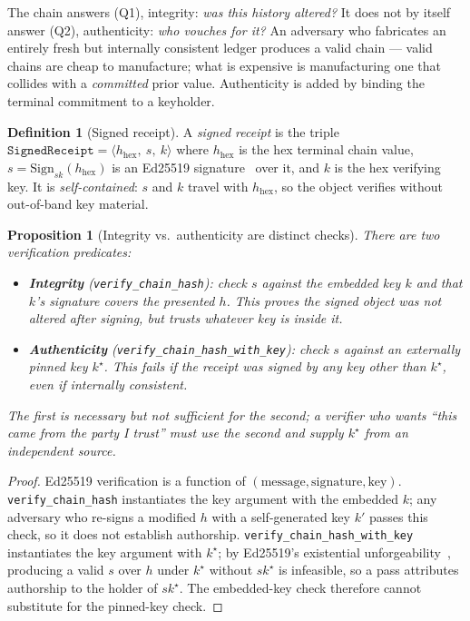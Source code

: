 \documentclass[11pt,oneside]{book}
\theoremstyle{definition}
\newtheorem{definition}{Definition}[chapter]
\theoremstyle{plain}
\newtheorem{proposition}[theorem]{Proposition}
\theoremstyle{remark}
\newcommand{\code}[1]{\texttt{#1}}
\begin{document}
The chain answers (Q1), integrity: \emph{was this history altered?} It does not by itself
answer (Q2), authenticity: \emph{who vouches for it?} An adversary who fabricates an entirely
fresh but internally consistent ledger produces a valid chain --- valid chains are cheap to
manufacture; what is expensive is manufacturing one that collides with a \emph{committed}
prior value. Authenticity is added by binding the terminal commitment to a keyholder.

\begin{definition}[Signed receipt]\label{def:signed}
A \emph{signed receipt} is the triple
$\code{SignedReceipt}=\langle h_{\mathrm{hex}},\ s,\ k\rangle$ where $h_{\mathrm{hex}}$ is the
hex terminal chain value, $s=\mathrm{Sign}_{sk}(h_{\mathrm{hex}})$ is an Ed25519
signature~\cite{ed25519} over it, and $k$ is the hex verifying key. It is \emph{self-contained}:
$s$ and $k$ travel with $h_{\mathrm{hex}}$, so the object verifies without out-of-band key
material.
\end{definition}

\begin{proposition}[Integrity vs.\ authenticity are distinct checks]\label{prop:intauth}
There are two verification predicates:
\begin{itemize}[leftmargin=*]
\item \textbf{Integrity} (\code{verify\_chain\_hash}): check $s$ against the \emph{embedded}
key $k$ and that $k$'s signature covers the presented $h$. This proves the signed object was
not altered after signing, but trusts whatever key is inside it.
\item \textbf{Authenticity} (\code{verify\_chain\_hash\_with\_key}): check $s$ against an
\emph{externally pinned} key $k^{\star}$. This fails if the receipt was signed by any key other
than $k^{\star}$, even if internally consistent.
\end{itemize}
The first is necessary but not sufficient for the second; a verifier who wants ``this came from
the party I trust'' must use the second and supply $k^{\star}$ from an independent source.
\end{proposition}

\begin{proof}
Ed25519 verification is a function of $(\text{message},\text{signature},\text{key})$.
\code{verify\_chain\_hash} instantiates the key argument with the embedded $k$; any adversary
who re-signs a modified $h$ with a self-generated key $k'$ passes this check, so it does not
establish authorship. \code{verify\_chain\_hash\_with\_key} instantiates the key argument with
$k^{\star}$; by Ed25519's existential unforgeability~\cite{ed25519}, producing a valid $s$ over
$h$ under $k^{\star}$ without $sk^{\star}$ is infeasible, so a pass attributes authorship to the
holder of $sk^{\star}$. The embedded-key check therefore cannot substitute for the pinned-key
check. \end{proof}
\end{document}
